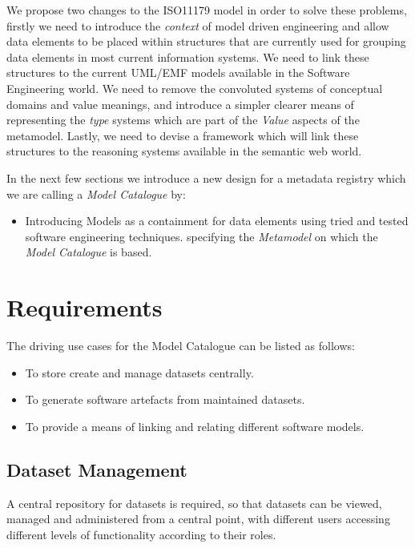 \documentclass{article}
\begin{document}
We propose two changes to the ISO11179 model in order to solve these problems, firstly we need to introduce the \emph{context} of model driven engineering and allow data elements to be placed within structures that are currently used for grouping data elements in most current information systems. We need to link these structures to the current UML/EMF models available in the Software Engineering world. We need to remove the convoluted systems of conceptual domains and value meanings, and introduce a simpler clearer means of representing the \emph{type} systems which are part of the \emph{Value} aspects of the metamodel. Lastly, we need to devise a framework which will link these structures to the reasoning systems available in the semantic web world.

In the next few sections we introduce a new design for a metadata registry which we are calling a \emph{Model Catalogue} by:
\begin{itemize}
	\item Introducing Models as a containment for data elements using tried and tested software engineering techniques.
	\itemFormally specifying the \emph{Metamodel} on which the \emph{Model Catalogue} is based.
\end{itemize}

 

\section{Requirements}

The driving use cases for the Model Catalogue can be listed as follows:
\begin{itemize}
\item To store create and manage datasets centrally.
\item To generate software artefacts from maintained datasets.
\item To provide a means of linking and relating different software models.
\end{itemize}

\subsection{Dataset Management}

A central repository for datasets is required, so that datasets can be viewed, managed and administered from a central point, with different users accessing different levels of functionality according to their roles. 
\end{document}
